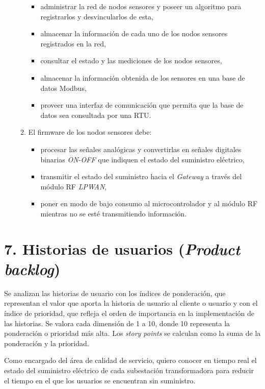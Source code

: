 \documentclass[
11pt, %
]{charter}
\begin{document}
\begin{enumerate}
\begin{enumerate}
\begin{itemize}
					\item administrar la red de nodos sensores y poseer un algoritmo para registrarlos y desvincularlos de esta,
					\item almacenar la información de cada uno de los nodos sensores registrados en la red,
					\item consultar el estado y las mediciones de los nodos sensores,
					\item almacenar la información obtenida de los sensores en una base de datos Modbus,
					\item proveer una interfaz de comunicación que permita que la base de datos sea consultada por una RTU.
				\end{itemize}
			\item El firmware de los nodos sensores debe:
				\begin{itemize}
					\item procesar las señales analógicas y convertirlas en señales digitales binarias \textit{ON-OFF} que indiquen el estado del suministro eléctrico,
					\item transmitir el estado del suministro hacia el \textit{Gateway} a través del módulo RF \textit{LPWAN},
					\item poner en modo de bajo consumo al microcontrolador y al módulo RF mientras no se esté transmitiendo información.
				\end{itemize}
		\end{enumerate}
\end{enumerate}


\section{7. Historias de usuarios (\textit{Product backlog})}
\label{sec:backlog}

Se analizan las historias de usuario con los índices de ponderación, que representan el valor que
aporta la historia de usuario al cliente o usuario y con el índice de prioridad, que refleja el orden
de importancia en la implementación de las historias. Se valora cada dimensión de 1 a 10, donde
10 representa la ponderación o prioridad más alta. Los \textit{story points} se calculan como la suma
de la ponderación y la prioridad.

Como encargado del área de calidad de servicio, quiero conocer en tiempo real el estado del suministro eléctrico de cada subestación transformadora para reducir el tiempo en el que los usuarios se encuentran sin suministro.
\end{document}
